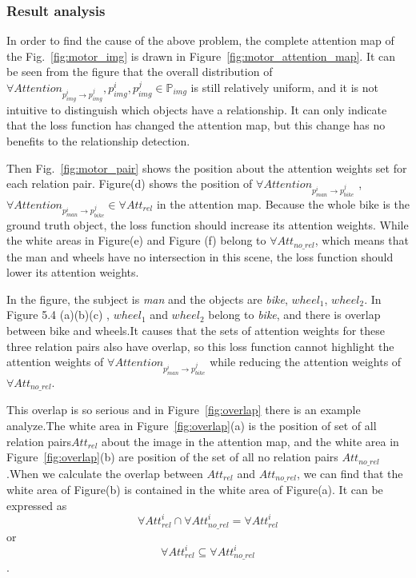 \subsubsection{Result analysis}

In order to find the cause of the above problem, the complete attention map of the Fig.~\ref{fig:motor_img} is drawn in Figure~\ref{fig:motor_attention_map}. It can be seen from the figure that the overall distribution of $ \forall Attention_{p^i_{img} \to p^j_{img}} , p^i_{img},p^j_{img} \in \mathbb{P}_{img} $ is still relatively uniform, and it is not intuitive to distinguish which objects have a relationship. It can only indicate that the loss function has changed the attention map, but this change has no benefits to the relationship detection.

Then Fig.~\ref{fig:motor_pair}  shows the position about the attention weights set for each relation pair. Figure(d) shows the position of $ \forall Attention_{p^i_{man} \to p^j_{bike}} $ ,  $ \forall Attention_{p^i_{man} \to p^j_{bike}} \in \forall Att_{rel} $ in the attention map. Because the whole bike is the ground truth object, the loss function should increase its attention weights. While the white areas in Figure(e) and Figure (f) belong to $ \forall Att_{no\_rel} $, which means that the man and wheels have no intersection in this scene, the loss function should lower its attention weights.

In the figure, the subject is \textit{man} and the objects are \textit{bike}, \textit{$ wheel_1 $}, \textit{$ wheel_2 $}. In Figure 5.4 (a)(b)(c) , \textit{$ wheel_1 $} and \textit{$ wheel_2 $} belong to \textit{bike}, and there is overlap between bike and wheels.It causes that the sets of attention weights for these three relation pairs also have overlap,  so this loss function cannot highlight the attention weights of $ \forall Attention_{p^i_{man} \to p^j_{bike}} $ while reducing the attention weights of  $ \forall Att_{no\_rel} $.

This overlap is so serious and in Figure~\ref{fig:overlap} there is an example analyze.The white area in Figure~\ref{fig:overlap}(a) is the position of set of all relation pairs$ Att_{rel} $  about the image in the attention map, and the white area in Figure~\ref{fig:overlap}(b)  are position of the set of all no relation pairs $ Att_{no\_rel} $.When we calculate the overlap between $Att_{rel} $ and  $Att_{no\_rel} $, we can find that the white area of Figure(b) is contained in the white area of Figure(a). It can be expressed as  $$ \forall Att^i_{rel} \cap  \forall Att^i_{no\_rel } = \forall Att^i_{rel}  $$ or $$ \forall Att^i_{rel}  \subseteq  \forall Att^i_{no\_rel }$$.

